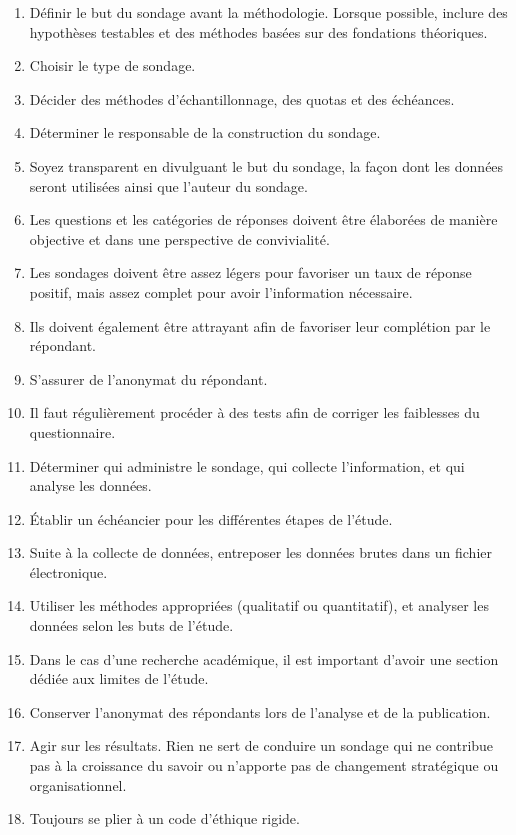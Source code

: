 \documentclass[
  letterpaper,
]{scrbook}
\begin{document}
\begin{enumerate}
\def\labelenumi{\arabic{enumi}.}
\item
  Définir le but du sondage avant la méthodologie. Lorsque possible,
  inclure des hypothèses testables et des méthodes basées sur des
  fondations théoriques.
\item
  Choisir le type de sondage.
\item
  Décider des méthodes d'échantillonnage, des quotas et des échéances.
\item
  Déterminer le responsable de la construction du sondage.
\item
  Soyez transparent en divulguant le but du sondage, la façon dont les
  données seront utilisées ainsi que l'auteur du sondage.
\item
  Les questions et les catégories de réponses doivent être élaborées de
  manière objective et dans une perspective de convivialité.
\item
  Les sondages doivent être assez légers pour favoriser un taux de
  réponse positif, mais assez complet pour avoir l'information
  nécessaire.
\item
  Ils doivent également être attrayant afin de favoriser leur complétion
  par le répondant.
\item
  S'assurer de l'anonymat du répondant.
\item
  Il faut régulièrement procéder à des tests afin de corriger les
  faiblesses du questionnaire.
\item
  Déterminer qui administre le sondage, qui collecte l'information, et
  qui analyse les données.
\item
  Établir un échéancier pour les différentes étapes de l'étude.
\item
  Suite à la collecte de données, entreposer les données brutes dans un
  fichier électronique.
\item
  Utiliser les méthodes appropriées (qualitatif ou quantitatif), et
  analyser les données selon les buts de l'étude.
\item
  Dans le cas d'une recherche académique, il est important d'avoir une
  section dédiée aux limites de l'étude.
\item
  Conserver l'anonymat des répondants lors de l'analyse et de la
  publication.
\item
  Agir sur les résultats. Rien ne sert de conduire un sondage qui ne
  contribue pas à la croissance du savoir ou n'apporte pas de changement
  stratégique ou organisationnel.
\item
  Toujours se plier à un code d'éthique rigide.
\end{enumerate}
\end{document}
